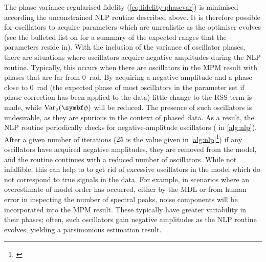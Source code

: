 The phase variance-regularised fidelity (\cref{eq:fidelity-phasevar}) is
minimised according the unconstrained \ac{NLP} routine described above. It is
therefore possible for oscillators to acquire parameters which are unrealistic
as the optimiser evolves (see the bulleted list on
 for a summary of
the expected ranges that the parameters reside in). With the inclusion of
the variance of oscillator phases, there are situations where oscillators
acquire negative amplitudes during the \ac{NLP} routine. Typically, this occurs
when there are oscillators in the \ac{MPM} result with phases
that are far from \qty{0}{\radian}. By acquiring a negative amplitude and a
phase close to
\qty{0}{\radian} (the expected phase of most oscillators in the parameter set
if phase correction has been applied to the data)
little change to the \ac{RSS} term is made, while
$\circvar$ will be reduced. The presence of such oscillators is
undesirable, as they are spurious in the context of phased data. As a
result, the \ac{NLP} routine periodically checks for negative-amplitude oscillators
( in \cref{alg:nlp}). After a
given number of iterations ($25$ is the value given in \cref{alg:nlp}\footnote{
    \label{fn:neg-amps-25}
})
if any oscillators have acquired negative
amplitudes, they are removed from the model, and the routine continues with a
reduced number of oscillators. While not infallible, this can help to to get
rid of excessive oscillators in the
model which do not correspond to true signals in the data. For example, in
scenarios where an overestimate of model order has occurred, either by the
\ac{MDL} or from human error in inspecting the number of spectral peaks, noise
components will be incorporated into the \ac{MPM} result. These typically have
greater variability in their phases; often, such oscillators gain negative
amplitudes as the \ac{NLP} routine evolves, yielding a parsimonious estimation
result.
